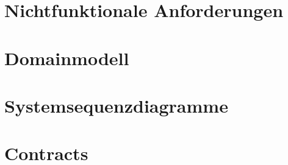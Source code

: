 \documentclass[a4paper,12pt,halfparskip,DIV14]{scrartcl}
\begin{document}

\section{Nichtfunktionale Anforderungen}\label{cha:nichtfunktionale_anforderungen} %


\section{Domainmodell}\label{cha:domainmodell} %


\section{Systemsequenzdiagramme}\label{cha:systemsequenzdiagramme} %


\section{Contracts}\label{cha:contracts} %

\end{document}
